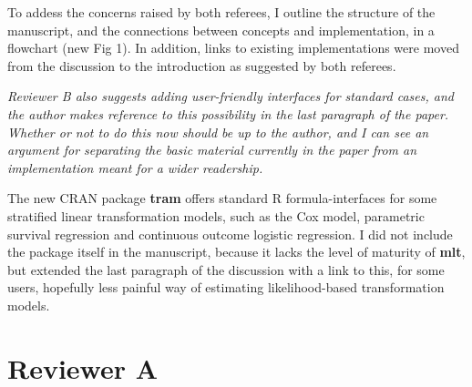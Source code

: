 \documentclass[12pt]{article}
\begin{document}
To addess the concerns raised by both referees, I outline the structure of
the manuscript, and the connections between concepts and implementation, in
a flowchart (new Fig 1). In addition, links to existing implementations were
moved from the discussion to the introduction as suggested by both referees.

\textit{Reviewer B also suggests adding user-friendly interfaces for standard
cases, and the author makes reference to this possibility in the last
paragraph of the paper. Whether or not to do this now should be up to
the author, and I can see an argument for separating the basic material
currently in the paper from an implementation meant for a wider
readership.}

The new CRAN package \textbf{tram} offers standard R formula-interfaces for
some stratified linear transformation models, such as the Cox model,
parametric survival regression and continuous outcome logistic regression. I
did not include the package itself in the manuscript, because it lacks the
level of maturity of \textbf{mlt}, but extended the last paragraph of the
discussion with a link to this, for some users, hopefully less painful way
of estimating likelihood-based transformation models.

\section*{Reviewer A}
\end{document}
